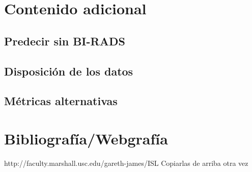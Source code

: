 \documentclass{article}
\begin{document}
\section{Contenido adicional}

\subsection{Predecir sin BI-RADS}

\subsection{Disposición de los datos}


\subsection{Métricas alternativas}


\section{Bibliografía/Webgrafía}

http://faculty.marshall.usc.edu/gareth-james/ISL
Copiarlas de arriba otra vez
\end{document}
